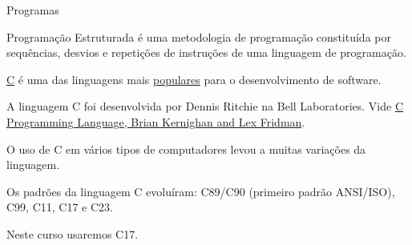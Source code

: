 \documentclass{beamer}
\begin{document}
\begin{frame}[allowframebreaks]{Programas}

  Programação Estruturada é uma metodologia de programação constituída
  por sequências, desvios e repetições de instruções de uma linguagem
  de programação.

  \framebreak

  \href{https://en.wikipedia.org/wiki/C_(programming_language)}{C} é
  uma das linguagens mais
  \href{https://solutionshub.epam.com/blog/post/programming-language-popularity-on-github}{populares}
  para o desenvolvimento de software.

  A linguagem C foi desenvolvida por Dennis Ritchie na Bell
  Laboratories. Vide
  \href{https://youtu.be/G1-wse8nsxY?si=lx0ygn0QGbFg_Bz0}{C
    Programming Language, Brian Kernighan and Lex Fridman}.

  O uso de C em vários tipos de computadores levou a muitas variações
  da linguagem.

  \framebreak

  Os padrões da linguagem C evoluíram: C89/C90 (primeiro padrão
  ANSI/ISO), C99, C11, C17 e C23.

  Neste curso usaremos C17.

\end{frame}
\end{document}
